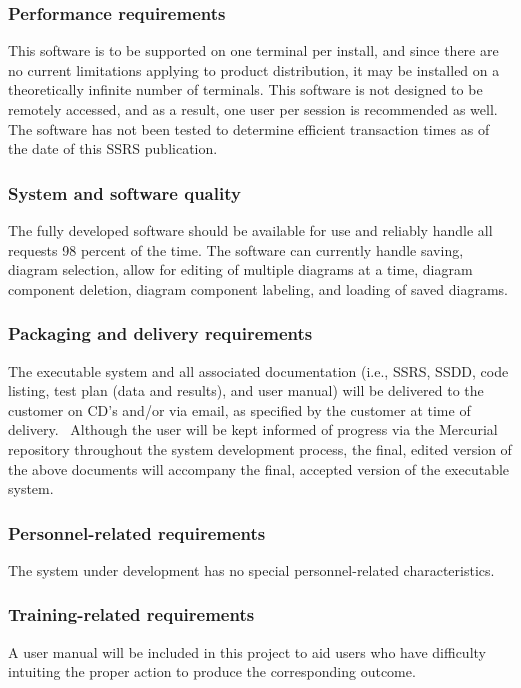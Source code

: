 \documentclass[twoside,letterpaper]{article}
\begin{document}
\subsubsection[Performance requirements]{\rmfamily\bfseries
Performance requirements}
{
This software is to be supported on one terminal per install, and since there are no current
 limitations applying to product distribution, it may be installed on a theoretically infinite 
number of terminals. This software is not designed to be remotely accessed, and as a result, 
one user per session is recommended as well.  The software has not been tested to determine 
efficient transaction times as of the date of this SSRS publication.
}

\subsubsection[System and software quality]{\rmfamily\bfseries System
and software quality}
{
The fully developed software should be available for use and reliably handle all requests 98 
percent of the time.  The software can currently handle saving, diagram selection, allow for 
editing of multiple diagrams at a time, diagram component deletion, diagram component labeling, 
and loading of saved diagrams.
}

\subsubsection[Packaging and delivery requirements]{\rmfamily\bfseries
Packaging and delivery requirements}
{
The executable system and all associated documentation (i.e., SSRS, SSDD, code listing, test plan (data and results), and user manual) will be delivered to the customer on CD{\textquoteright}s and/or via email, as
specified by the customer at time of delivery. \ Although the user will be kept informed of progress via the Mercurial repository throughout the
system development process, the final, edited version of the above
documents will accompany the final, accepted version of the executable
system.}

\subsubsection[Personnel{}-related requirements]{\rmfamily\bfseries
Personnel-related requirements}
{
The system under development has no special personnel-related
characteristics. }

\subsubsection[Training{}-related requirements]{\rmfamily\bfseries
Training-related requirements}
{
A user manual will be included in this project to aid users who have difficulty intuiting the proper action to produce the corresponding outcome.
}
\end{document}
